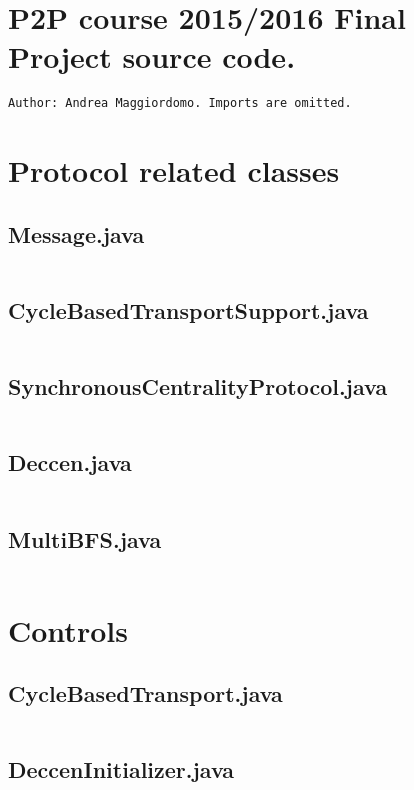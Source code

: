 \documentclass[a4paper, 10pt]{article}
\begin{document}
\section*{P2P course 2015/2016 Final Project source code.}
\begin{verbatim}
Author: Andrea Maggiordomo. Imports are omitted.
\end{verbatim}
\section{Protocol related classes}
\subsection*{Message.java}
\inputminted[firstline=16]{java}{../src/centrality/Message.java}
\subsection*{CycleBasedTransportSupport.java}
\inputminted[firstline=13]{java}{../src/centrality/CycleBasedTransportSupport.java}
\subsection*{SynchronousCentralityProtocol.java}
\inputminted[firstline=18]{java}{../src/centrality/SynchronousCentralityProtocol.java}
\subsection*{Deccen.java}
\inputminted[firstline=24]{java}{../src/centrality/Deccen.java}
\subsection*{MultiBFS.java}
\inputminted[firstline=25]{java}{../src/centrality/MultiBFS.java}

\section{Controls}

\subsection*{CycleBasedTransport.java}
\inputminted[firstline=19]{java}{../src/centrality/CycleBasedTransport.java}
\subsection*{DeccenInitializer.java}
\inputminted[firstline=16]{java}{../src/centrality/DeccenInitializer.java}
\end{document}
